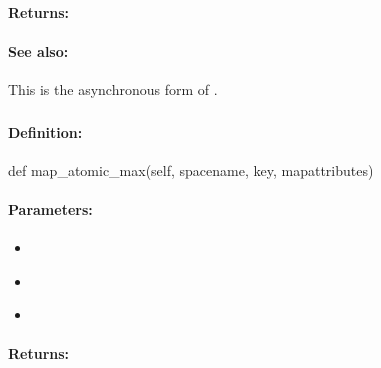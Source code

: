 \paragraph{Returns:}


\paragraph{See also:}  This is the asynchronous form of .

\pagebreak
\subsubsection{}
\label{api:python:map_atomic_max}


\paragraph{Definition:}
\begin{pythoncode}
def map_atomic_max(self, spacename, key, mapattributes)
\end{pythoncode}

\paragraph{Parameters:}
\begin{itemize}[noitemsep]
\item {}\\

\item {}\\

\item {}\\

\end{itemize}

\paragraph{Returns:}


\pagebreak
\subsubsection{}
\label{api:python:async_map_atomic_max}


